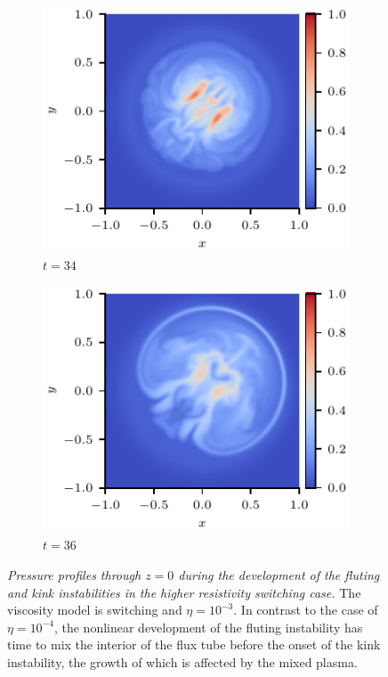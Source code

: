 \documentclass[12pt]{article}
\newcommand{\mycaption}[2]{\caption[#1]{\emph{#1} #2}}
\begin{document}
\begin{figure}[t]
\begin{subfigure}{0.32\textwidth}
      \includegraphics[width=\linewidth]{swi-3_pressure_17.pdf}
      \caption{$t=34$}
      \label{fig:swi-3_pressure_17}
    \end{subfigure}
    \hfill
    \begin{subfigure}{0.32\textwidth}
      \includegraphics[width=\linewidth]{swi-3_pressure_18.pdf}
      \caption{$t=36$}
      \label{fig:swi-3_pressure_18}
    \end{subfigure}
\mycaption{Pressure profiles through $z=0$ during the development of the fluting and kink instabilities in the higher resistivity switching case.}{The viscosity model is switching and $\eta = 10^{-3}$. In contrast to the case of $\eta=10^{-4}$, the nonlinear development of the fluting instability has time to mix the interior of the flux tube before the onset of the kink instability, the growth of which is affected by the mixed plasma.}
\label{fig:kink_pressure_slices-3}%
\end{figure}
\end{document}
